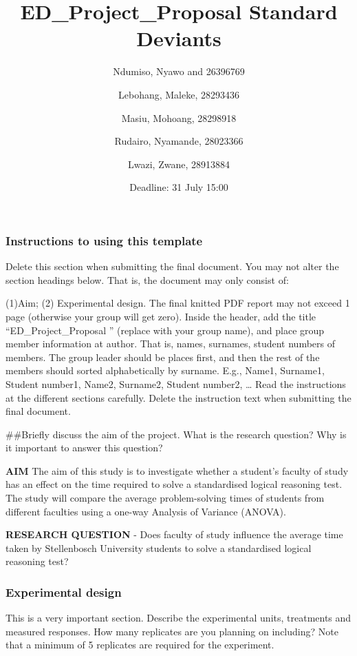 \documentclass[
]{article}
\title{ED\_Project\_Proposal Standard Deviants}
\author{Ndumiso, Nyawo and 26396769 \and Lebohang, Maleke,
28293436 \and Masiu, Mohoang, 28298918 \and Rudairo, Nyamande,
28023366 \and Lwazi, Zwane, 28913884}
\date{Deadline: 31 July 15:00}
\begin{document}
\maketitle

\subsubsection{Instructions to using this
template}\label{instructions-to-using-this-template}

Delete this section when submitting the final document. You may not
alter the section headings below. That is, the document may only consist
of:

(1)Aim; (2) Experimental design. The final knitted PDF report may not
exceed 1 page (otherwise your group will get zero). Inside the header,
add the title ``ED\_Project\_Proposal '' (replace with your group name),
and place group member information at author. That is, names, surnames,
student numbers of members. The group leader should be places first, and
then the rest of the members should sorted alphabetically by surname.
E.g., Name1, Surname1, Student number1, Name2, Surname2, Student
number2, \ldots{} Read the instructions at the different sections
carefully. Delete the instruction text when submitting the final
document.

\#\#Briefly discuss the aim of the project. What is the research
question? Why is it important to answer this question?

\textbf{AIM} The aim of this study is to investigate whether a student's
faculty of study has an effect on the time required to solve a
standardised logical reasoning test. The study will compare the average
problem-solving times of students from different faculties using a
one-way Analysis of Variance (ANOVA).

\textbf{RESEARCH QUESTION} - Does faculty of study influence the average
time taken by Stellenbosch University students to solve a standardised
logical reasoning test?

\subsubsection{Experimental design}\label{experimental-design}

This is a very important section. Describe the experimental units,
treatments and measured responses. How many replicates are you planning
on including? Note that a minimum of 5 replicates are required for the
experiment.
\end{document}
